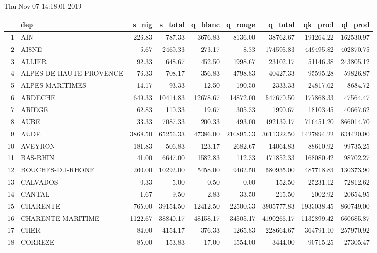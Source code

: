 \documentclass[11pt, a4paper]{article}
\begin{document}
\begin{center}
Thu Nov 07 14:18:01 2019
\begin{table}[ht]
\centering
\begin{tabular}{rlrrrrrrr}
  \hline
 & dep & s\_nig & s\_total & q\_blanc & q\_rouge & q\_total & qk\_prod & ql\_prod 
\\ 
  \hline
1 & AIN & 226.83 & 787.33 & 3676.83 & 8136.00 & 38762.67 & 191264.22 & 162530.97 \\ 
  2 & AISNE & 5.67 & 2469.33 & 273.17 & 8.33 & 174595.83 & 449495.82 & 402870.75 \\
  3 & ALLIER & 92.33 & 648.67 & 452.50 & 1998.67 & 23102.17 & 51146.38 & 243805.12 \\ 
  4 & ALPES-DE-HAUTE-PROVENCE & 76.33 & 708.17 & 356.83 & 4798.83 & 40427.33 & 95595.28 & 59826.87 \\ 
  5 & ALPES-MARITIMES & 14.17 & 93.33 & 12.50 & 190.50 & 2333.33 & 24817.62 & 8684.72 \\
  6 & ARDECHE & 649.33 & 10414.83 & 12678.67 & 14872.00 & 547670.50 & 177868.33 & 
47564.47 \\ 
  7 & ARIEGE & 62.83 & 110.33 & 19.67 & 305.33 & 1990.67 & 18103.45 & 40667.62 \\ 
  8 & AUBE & 33.33 & 7087.33 & 200.33 & 493.00 & 492139.17 & 716451.20 & 866014.70 \\
  9 & AUDE & 3868.50 & 65256.33 & 47386.00 & 210895.33 & 3611322.50 & 1427894.22 & 634420.90 \\ 
  10 & AVEYRON & 181.83 & 506.83 & 123.17 & 2682.67 & 14064.83 & 88610.92 & 99735.25 \\
  11 & BAS-RHIN & 41.00 & 6647.00 & 1582.83 & 112.33 & 471852.33 & 168080.42 & 98702.27 \\
  12 & BOUCHES-DU-RHONE & 260.00 & 10292.00 & 5458.00 & 9462.50 & 580935.00 & 487718.83 & 130373.90 \\ 
  13 & CALVADOS & 0.33 & 5.00 & 0.50 & 0.00 & 152.50 & 25231.12 & 72812.62 \\ 
  14 & CANTAL & 1.67 & 9.50 & 2.83 & 33.50 & 215.50 & 2002.92 & 20654.95 \\ 
  15 & CHARENTE & 765.00 & 39154.50 & 12412.50 & 22500.33 & 3905777.83 & 1933038.45 & 860749.00 \\ 
  16 & CHARENTE-MARITIME & 1122.67 & 38840.17 & 48158.17 & 34505.17 & 4190266.17 & 1132899.42 & 660685.87 \\ 
  17 & CHER & 84.00 & 4154.17 & 376.33 & 1265.83 & 228664.67 & 364791.10 & 257970.92 \\ 
  18 & CORREZE & 85.00 & 153.83 & 17.00 & 1554.00 & 3444.00 & 90715.25 & 27305.47 

\end{tabular}
\end{table}
\end{center}
\end{document}
